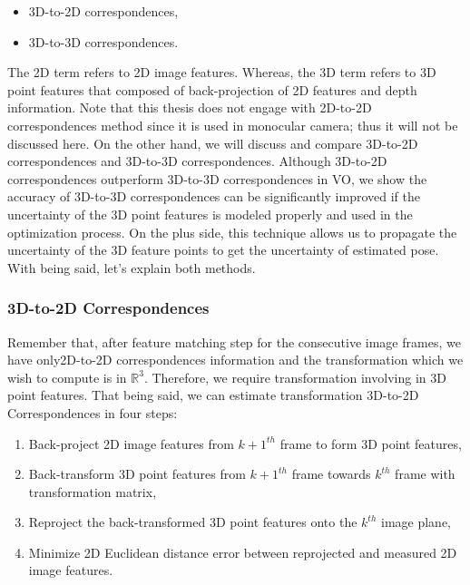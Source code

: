 \documentclass[a4paper]{report}
\numberwithin{figure}{section}
\newcommand{\R}{\mathbb{R}}
\begin{document}
\begin{itemize}
  \item 3D-to-2D correspondences,
  \item 3D-to-3D correspondences.
\end{itemize}


The 2D term refers to 2D image features. Whereas, the 3D term refers to 3D 
point features that composed of back-projection of 2D features and depth 
information.  Note that this thesis does not engage with 2D-to-2D 
correspondences method since it is used in monocular camera; thus it will not 
be discussed here. On the other hand, we will discuss and compare 3D-to-2D 
correspondences and 3D-to-3D correspondences.  Although 3D-to-2D 
correspondences outperform 3D-to-3D correspondences in VO, we show the 
accuracy of 3D-to-3D correspondences can be significantly improved if the 
uncertainty of the 3D point features is modeled properly and used in the 
optimization process.  On the plus side, this technique allows us to propagate 
the uncertainty of the 3D feature points to get the uncertainty of estimated 
pose.  With being said, let's explain both methods.


\subsubsection{3D-to-2D Correspondences}\label{sb_sc_3d_to_2d}

Remember that, after feature matching step for the consecutive image frames, 
we have only2D-to-2D correspondences information and the transformation which 
we wish to compute is in $\R^3$. Therefore, we require transformation 
involving in 3D point features. That being said, we can estimate 
transformation 3D-to-2D Correspondences in four steps:

\begin{enumerate}
  \item Back-project 2D image features from $k+1^{th}$ frame to form 3D point features,
  \item Back-transform 3D point features from $k+1^{th}$ frame towards $k^{th}$ frame 
    with transformation matrix,
  \item Reproject the back-transformed 3D point features onto the $k^{th}$ image plane, 
  \item Minimize 2D Euclidean distance error between reprojected and measured 2D image features.
\end{enumerate}
\end{document}
